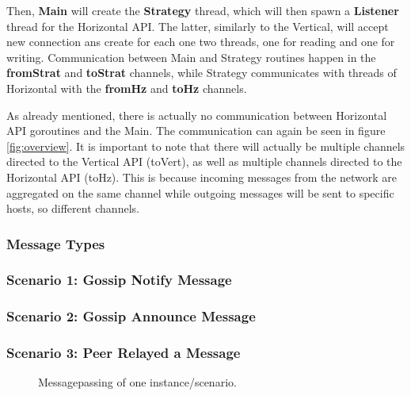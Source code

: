 \documentclass[a4paper,english,10pt,NET]{tumarticle}
\begin{document}
Then, \textbf{Main} will create the \textbf{Strategy} thread, which will then spawn a \textbf{Listener} thread for the {Horizontal API}. The latter, similarly to the Vertical, will accept new connection ans create for each one two threads, one for reading and one for writing. Communication between Main and Strategy routines happen in the \textbf{fromStrat} and \textbf{toStrat} channels, while Strategy communicates with threads of Horizontal with the \textbf{fromHz} and \textbf{toHz} channels.

As already mentioned, there is actually no communication between Horizontal API goroutines and the Main. The communication can again be seen in figure \ref{fig:overview}. It is important to note that there will actually be multiple channels directed to the Vertical API (toVert), as well as multiple channels directed to the Horizontal API (toHz). This is because incoming messages from the network are aggregated on the same channel while outgoing messages will be sent to specific hosts, so different channels.

\subsubsection{Message Types}


\subsubsection{Scenario 1: Gossip Notify Message}

\subsubsection{Scenario 2: Gossip Announce Message}

\subsubsection{Scenario 3: Peer Relayed a Message}


\begin{figure}
	\centering
	
	\caption{Messagepassing of one instance/scenario.}
	\label{fig:msg}
\end{figure}

% 	
\end{document}
